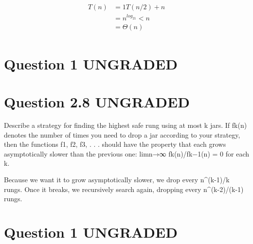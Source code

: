 \documentclass[11pt, oneside]{article}
\begin{document}
\begin{align*} 
T(n) &= 1T(n/2) + n \\
&= n^{log_21} < n \\
&= \Theta(n) \\
\end{align*}

\clearpage

\section{Question 1 UNGRADED}


\clearpage

\section{Question 2.8 UNGRADED}

Describe a strategy for finding the highest safe rung using at most k jars. If fk(n) denotes the number of times you need to drop a jar according to your strategy, then the functions f1, f2, f3, . . . should have the property that each grows asymptotically slower than the previous one: limn→∞ fk(n)/fk−1(n) = 0 for each k. \newline

Because we want it to grow asymptotically slower, we drop every n^(k-1)/k rungs. Once it breaks, we recursively search again, dropping every n^(k-2)/(k-1) rungs.


\clearpage

\section{Question 1 UNGRADED}


\clearpage
\end{document}
